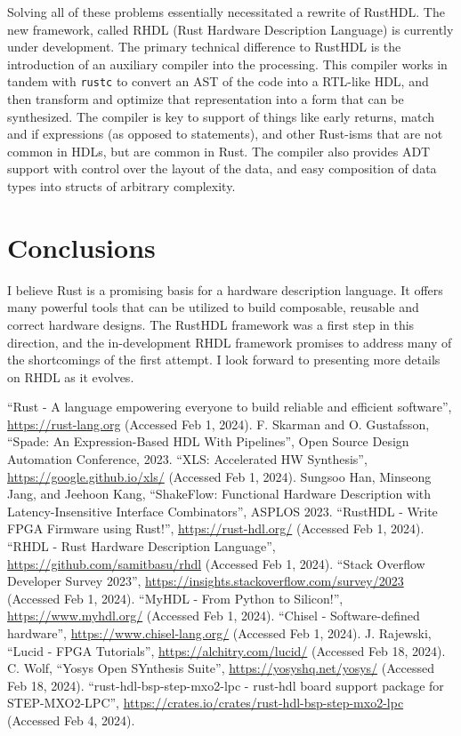 \documentclass[sigplan,screen,sigconf]{acmart}
\begin{document}
Solving all of these problems essentially necessitated a rewrite of RustHDL.  The new framework,
called RHDL (Rust Hardware Description Language) is currently under development.  The primary
technical difference to RustHDL is the introduction of an auxiliary compiler into the processing.
This compiler works in tandem with \verb|rustc| to convert an AST of the code into a RTL-like
HDL, and then transform and optimize that representation into a form that can be synthesized.  The 
compiler is key to support of things like early returns, match and if expressions (as opposed to statements),
and other Rust-isms that are not common in HDLs, but are common in Rust.  The compiler also provides
ADT support with control over the layout of the data, and easy composition of data types into structs
of arbitrary complexity.  

\section{Conclusions}
I believe Rust is a promising basis for a hardware description language.  It offers many powerful tools
that can be utilized to build composable, reusable and correct hardware designs.  The RustHDL framework
was a first step in this direction, and the in-development RHDL framework promises to address many of the
shortcomings of the first attempt. I look forward to presenting more details on RHDL as it evolves.

\begin{thebibliography}{00}
   ``Rust - A language empowering everyone to build reliable and efficient software'', \url{https://rust-lang.org} (Accessed Feb 1, 2024).
   F. Skarman and O. Gustafsson, ``Spade: An Expression-Based HDL With Pipelines'', Open Source Design Automation Conference, 2023.
   ``XLS: Accelerated HW Synthesis'', \url{https://google.github.io/xls/} (Accessed Feb 1, 2024).
   Sungsoo Han, Minseong Jang, and Jeehoon Kang, ``ShakeFlow: Functional Hardware Description with Latency-Insensitive Interface Combinators'', ASPLOS 2023.
   ``RustHDL - Write FPGA Firmware using Rust!'', \url{https://rust-hdl.org/} (Accessed Feb 1, 2024).
   ``RHDL - Rust Hardware Description Language'', \url{https://github.com/samitbasu/rhdl} (Accessed Feb 1, 2024).
   ``Stack Overflow Developer Survey 2023'', \url{https://insights.stackoverflow.com/survey/2023} (Accessed Feb 1, 2024).
   ``MyHDL - From Python to Silicon!'', \url{https://www.myhdl.org/} (Accessed Feb 1, 2024).
   ``Chisel - Software-defined hardware'', \url{https://www.chisel-lang.org/} (Accessed Feb 1, 2024).
   J. Rajewski, ``Lucid - FPGA Tutorials'', \url{https://alchitry.com/lucid/} (Accessed Feb 18, 2024).
   C. Wolf, ``Yosys Open SYnthesis Suite'', \url{https://yosyshq.net/yosys/} (Accessed Feb 18, 2024).
   ``rust-hdl-bsp-step-mxo2-lpc - rust-hdl board support package for STEP-MXO2-LPC'', \url{https://crates.io/crates/rust-hdl-bsp-step-mxo2-lpc} (Accessed Feb 4, 2024).
\end{thebibliography}
\end{document}
